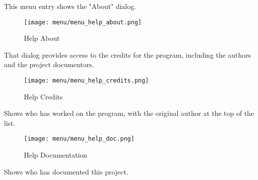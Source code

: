    This menu entry shows the "About" dialog.

\begin{figure}[H]
   \centering 
   \texttt{[image: menu/menu\_help\_about.png]}
   \caption{Help About}
   \label{fig:seq64_menu_help_about}
\end{figure}

   That dialog provides access to the credits for the program, including the
   authors and the project documentors.

\begin{figure}[H]
   \centering 
   \texttt{[image: menu/menu\_help\_credits.png]}
   \caption{Help Credits}
   \label{fig:seq64_menu_help_credits}
\end{figure}

   Shows who has worked on the program, with the original author at the top
   of the list.

\begin{figure}[H]
   \centering 
   \texttt{[image: menu/menu\_help\_doc.png]}
   \caption{Help Documentation}
   \label{fig:seq64_menu_help_doc}
\end{figure}

   Shows who has documented this project.

